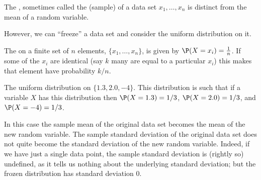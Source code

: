 

The , sometimes called the (sample)  of a data set $x_1,\dots,x_n$ is distinct from the mean of a random variable.

However, we can ``freeze'' a data set and consider the uniform distribution on it.
\begin{df}
The  on a finite set of $n$ elements, $\{x_1,\dots,x_n\}$, is given by $\P(X=x_i)=\frac1n$. If some of the $x_i$ are identical (say $k$ many are equal to a particular $x_i$) this makes that element have probability $k/n$.
\end{df}
\begin{example}{The uniform distribution on $\{1.3, 2.0, -4\}$.}
This distribution is such that if a variable $X$ has this distribution then $\P(X=1.3)=1/3$, $\P(X=2.0)=1/3$, and $\P(X=-4)=1/3$.
\end{example}

In this case the sample mean of the original data set becomes the mean of the new random variable. The sample standard deviation of the original data set does not quite become the standard deviation of the new random variable. Indeed, if we have just a single data point, the sample standard deviation is (rightly so) undefined, as it tells us nothing about the underlying standard deviation; but the frozen distribution has standard deviation 0.

